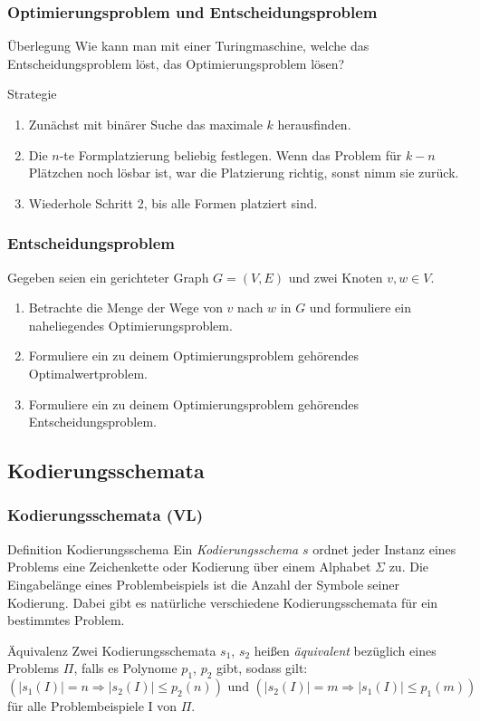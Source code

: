 \begin{frame}
 \frametitle{Optimierungsproblem und Entscheidungsproblem}
 \begin{block}{Überlegung}
  Wie kann man mit einer Turingmaschine, welche das Entscheidungsproblem löst, das Optimierungsproblem lösen?
 \end{block}
\begin{block}{Strategie}
 \begin{enumerate}
  \item Zunächst mit binärer Suche das maximale $k$ herausfinden.
  \item Die $n$-te Formplatzierung beliebig festlegen. Wenn das Problem für $k-n$ Plätzchen noch lösbar ist, war die Platzierung richtig, sonst nimm sie zurück.
  \item Wiederhole Schritt 2, bis alle Formen platziert sind.
 \end{enumerate}
\end{block}
\end{frame}



\begin{frame}
 \frametitle{Entscheidungsproblem}
  Gegeben seien ein gerichteter Graph $G = (V, E)$ und zwei Knoten $v, w \in V$.
  
  \begin{enumerate}
  	\item Betrachte die Menge der Wege von $v$ nach $w$ in $G$ und formuliere ein naheliegendes Optimierungsproblem.
  	\item Formuliere ein zu deinem Optimierungsproblem gehörendes Optimalwertproblem.
  	\item Formuliere ein zu deinem Optimierungsproblem gehörendes Entscheidungsproblem.
  \end{enumerate}
\end{frame}

\subsection{Kodierungsschemata}
\begin{frame}
 \frametitle{Kodierungsschemata (VL)}
 \begin{block}{Definition Kodierungsschema}
 Ein \emph{Kodierungsschema} $s$ ordnet jeder Instanz eines Problems eine Zeichenkette oder Kodierung über einem Alphabet $\Sigma$ zu. 
 Die Eingabelänge eines Problembeispiels ist die Anzahl der Symbole seiner Kodierung.
 Dabei gibt es natürliche verschiedene Kodierungsschemata für ein bestimmtes Problem.
 \end{block}
 \begin{block}{Äquivalenz}
  Zwei Kodierungsschemata $s_1$, $s_2$ heißen \emph{äquivalent} bezüglich eines Problems $\Pi$, falls es Polynome $p_1$, $p_2$ gibt, sodass gilt:
  \[
   (|s_1(I)| = n \Rightarrow |s_2(I)| \leq p_2(n))\mbox{ und } (|s_2(I)| = m \Rightarrow |s_1(I)| \leq p_1(m))
  \]
für alle Problembeispiele I von $\Pi$.
 \end{block}
\end{frame}

